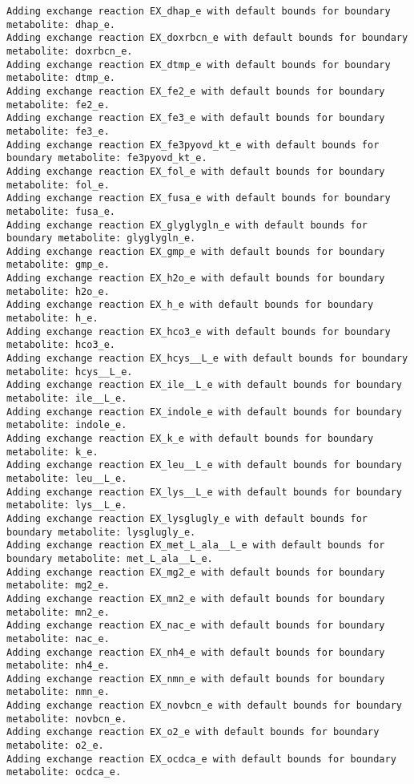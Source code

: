 \documentclass[
  letterpaper,
  DIV=11,
  numbers=noendperiod]{scrartcl}
\begin{document}
\begin{verbatim}
Adding exchange reaction EX_dhap_e with default bounds for boundary metabolite: dhap_e.
Adding exchange reaction EX_doxrbcn_e with default bounds for boundary metabolite: doxrbcn_e.
Adding exchange reaction EX_dtmp_e with default bounds for boundary metabolite: dtmp_e.
Adding exchange reaction EX_fe2_e with default bounds for boundary metabolite: fe2_e.
Adding exchange reaction EX_fe3_e with default bounds for boundary metabolite: fe3_e.
Adding exchange reaction EX_fe3pyovd_kt_e with default bounds for boundary metabolite: fe3pyovd_kt_e.
Adding exchange reaction EX_fol_e with default bounds for boundary metabolite: fol_e.
Adding exchange reaction EX_fusa_e with default bounds for boundary metabolite: fusa_e.
Adding exchange reaction EX_glyglygln_e with default bounds for boundary metabolite: glyglygln_e.
Adding exchange reaction EX_gmp_e with default bounds for boundary metabolite: gmp_e.
Adding exchange reaction EX_h2o_e with default bounds for boundary metabolite: h2o_e.
Adding exchange reaction EX_h_e with default bounds for boundary metabolite: h_e.
Adding exchange reaction EX_hco3_e with default bounds for boundary metabolite: hco3_e.
Adding exchange reaction EX_hcys__L_e with default bounds for boundary metabolite: hcys__L_e.
Adding exchange reaction EX_ile__L_e with default bounds for boundary metabolite: ile__L_e.
Adding exchange reaction EX_indole_e with default bounds for boundary metabolite: indole_e.
Adding exchange reaction EX_k_e with default bounds for boundary metabolite: k_e.
Adding exchange reaction EX_leu__L_e with default bounds for boundary metabolite: leu__L_e.
Adding exchange reaction EX_lys__L_e with default bounds for boundary metabolite: lys__L_e.
Adding exchange reaction EX_lysglugly_e with default bounds for boundary metabolite: lysglugly_e.
Adding exchange reaction EX_met_L_ala__L_e with default bounds for boundary metabolite: met_L_ala__L_e.
Adding exchange reaction EX_mg2_e with default bounds for boundary metabolite: mg2_e.
Adding exchange reaction EX_mn2_e with default bounds for boundary metabolite: mn2_e.
Adding exchange reaction EX_nac_e with default bounds for boundary metabolite: nac_e.
Adding exchange reaction EX_nh4_e with default bounds for boundary metabolite: nh4_e.
Adding exchange reaction EX_nmn_e with default bounds for boundary metabolite: nmn_e.
Adding exchange reaction EX_novbcn_e with default bounds for boundary metabolite: novbcn_e.
Adding exchange reaction EX_o2_e with default bounds for boundary metabolite: o2_e.
Adding exchange reaction EX_ocdca_e with default bounds for boundary metabolite: ocdca_e.

\end{verbatim}
\end{document}
